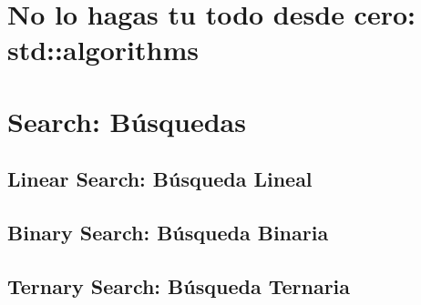\documentclass[12pt, fleqn]{report}                             %
\theoremstyle{break}                                            %
\begin{document}
    \clearpage
    \chapter{No lo hagas tu todo desde cero: std::algorithms}


    \clearpage
    \chapter{Search: Búsquedas}

        \section{Linear Search: Búsqueda Lineal}

        \section{Binary Search: Búsqueda Binaria}

        \section{Ternary Search: Búsqueda Ternaria}

\end{document}
